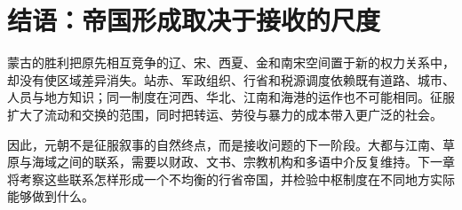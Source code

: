 \section{结语：帝国形成取决于接收的尺度}

蒙古的胜利把原先相互竞争的辽、宋、西夏、金和南宋空间置于新的权力关系中，却没有使区域差异消失。站赤、军政组织、行省和税源调度依赖既有道路、城市、人员与地方知识；同一制度在河西、华北、江南和海港的运作也不可能相同。征服扩大了流动和交换的范围，同时把转运、劳役与暴力的成本带入更广泛的社会。

因此，元朝不是征服叙事的自然终点，而是接收问题的下一阶段。大都与江南、草原与海域之间的联系，需要以财政、文书、宗教机构和多语中介反复维持。下一章将考察这些联系怎样形成一个不均衡的行省帝国，并检验中枢制度在不同地方实际能够做到什么。
